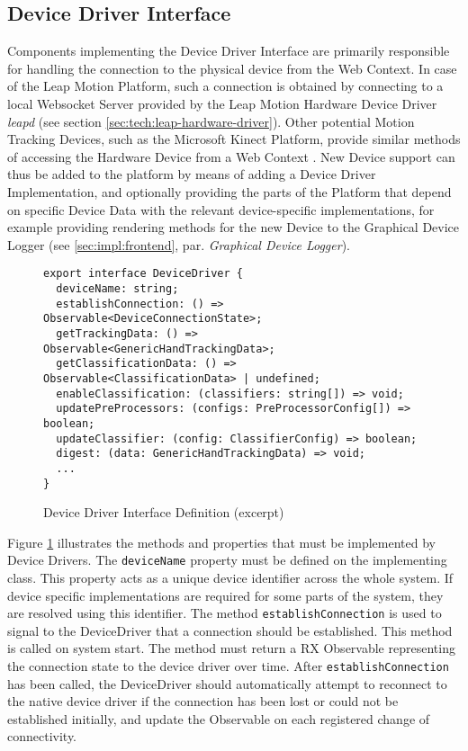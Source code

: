 \subsection{Device Driver Interface}
\label{sec:impl:driver}
Components implementing the Device Driver Interface are primarily responsible for handling the connection to the physical device from the Web Context. In case of the Leap Motion Platform, such a connection is obtained by connecting to a local Websocket Server provided by the Leap Motion Hardware Device Driver \emph{leapd} (see section \ref{sec:tech:leap-hardware-driver}). Other potential Motion Tracking Devices, such as the Microsoft Kinect Platform, provide similar methods of accessing the Hardware Device from a Web Context \cite{KinectSDK}. New Device support can thus be added to the platform by means of adding a Device Driver Implementation, and optionally providing the parts of the Platform that depend on specific Device Data with the relevant device-specific implementations, for example providing rendering methods for the new Device to the Graphical Device Logger (see \ref{sec:impl:frontend}, par. \emph{Graphical Device Logger}).
\begin{figure}
\begin{verbatim}
export interface DeviceDriver {
  deviceName: string;
  establishConnection: () => Observable<DeviceConnectionState>;
  getTrackingData: () => Observable<GenericHandTrackingData>;
  getClassificationData: () => Observable<ClassificationData> | undefined;
  enableClassification: (classifiers: string[]) => void;
  updatePreProcessors: (configs: PreProcessorConfig[]) => boolean;
  updateClassifier: (config: ClassifierConfig) => boolean;
  digest: (data: GenericHandTrackingData) => void;
  ...
}
\end{verbatim}
\caption{Device Driver Interface Definition (excerpt)}
\label{fig:device-driver-interface}
\end{figure}

Figure \ref{fig:device-driver-interface} illustrates the methods and properties that must be implemented by Device Drivers. The \texttt{deviceName} property must be defined on the implementing class. This property acts as a unique device identifier across the whole system. If device specific implementations are required for some parts of the system, they are resolved using this identifier. The method \texttt{establishConnection} is used to signal to the DeviceDriver that a connection should be established. This method is called on system start. The method must return a \gls{RX} Observable representing the connection state to the device driver over time. After \texttt{establishConnection} has been called, the DeviceDriver should automatically attempt to reconnect to the native device driver if the connection has been lost or could not be established initially, and update the Observable on each registered change of connectivity.

